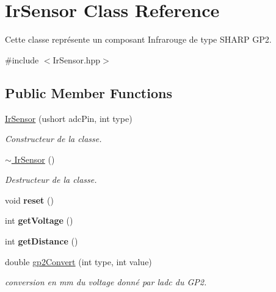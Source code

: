 \hypertarget{classIrSensor}{}\section{Ir\+Sensor Class Reference}
\label{classIrSensor}


Cette classe représente un composant Infrarouge de type S\+H\+A\+RP G\+P2.  




{\ttfamily \#include $<$Ir\+Sensor.\+hpp$>$}

\subsection*{Public Member Functions}
\begin{DoxyCompactItemize}
\item 
\mbox{\label{classIrSensor_a0d5d176c61d573ac8a10c9c3131af1c7}} 
\hyperlink{classIrSensor_a0d5d176c61d573ac8a10c9c3131af1c7}{Ir\+Sensor} (ushort adc\+Pin, int type)
\begin{DoxyCompactList}\small\item\em Constructeur de la classe. \end{DoxyCompactList}\item 
\mbox{\label{classIrSensor_ac975f80f34589a4546608e95165185c5}} 
\hyperlink{classIrSensor_ac975f80f34589a4546608e95165185c5}{$\sim$ Ir\+Sensor} ()
\begin{DoxyCompactList}\small\item\em Destructeur de la classe. \end{DoxyCompactList}\item 
\mbox{\label{classIrSensor_a3bfb022e619ad8ba71adb93b8e27a605}} 
void {\bfseries reset} ()
\item 
\mbox{\label{classIrSensor_ad96797601d8975a891996bb19ac7bea6}} 
int {\bfseries get\+Voltage} ()
\item 
\mbox{\label{classIrSensor_a2099e894a142d46bffab48ca69d4d79f}} 
int {\bfseries get\+Distance} ()
\item 
double \hyperlink{classIrSensor_ade39a20d2ec88e9ad4686e062093c91d}{gp2\+Convert} (int type, int value)
\begin{DoxyCompactList}\small\item\em conversion en mm du voltage donné par l\textquotesingle{}adc du G\+P2. \end{DoxyCompactList}\item 

\end{DoxyCompactItemize}
